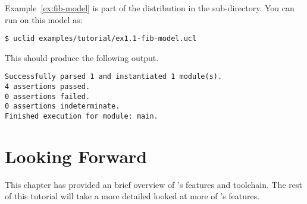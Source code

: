 Example~\ref{ex:fib-model} is part of the \uclid{} distribution in the  sub-directory. You can run \uclid{} on this model as:

\begin{verbatim}
$ uclid examples/tutorial/ex1.1-fib-model.ucl 
\end{verbatim}

This should produce the following output.
\begin{Verbatim}[frame=single, samepage=true]
Successfully parsed 1 and instantiated 1 module(s).
4 assertions passed.
0 assertions failed.
0 assertions indeterminate.
Finished execution for module: main.
\end{Verbatim}

\section{Looking Forward}

This chapter has provided an brief overview of \uclid{}'s features and toolchain. The rest of this tutorial will take a more detailed looked at more of \uclid{}'s features.
